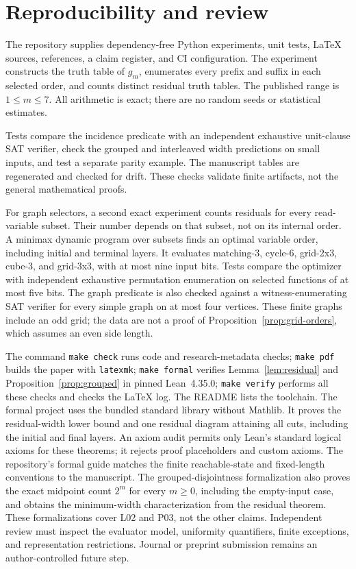 \section{Reproducibility and review}
The repository supplies dependency-free Python experiments, unit
tests, LaTeX sources, references, a claim register, and CI configuration.
The experiment constructs the truth table of \(g_m\), enumerates every
prefix and suffix in each selected order, and counts distinct residual
truth tables. The published range is \(1\leq m\leq7\).
All arithmetic is exact; there are no random seeds or statistical
estimates.

Tests compare the incidence predicate with an independent exhaustive
unit-clause SAT verifier, check the grouped and interleaved width
predictions on small inputs, and test a separate parity example.
The manuscript tables are regenerated and checked for drift.
These checks validate finite artifacts, not the general mathematical
proofs.

For graph selectors, a second exact experiment counts residuals for every
read-variable subset. Their number depends on that subset, not on its internal
order. A minimax dynamic program over subsets finds an optimal variable order,
including initial and terminal layers. It evaluates matching-3, cycle-6,
grid-2x3, cube-3, and grid-3x3, with at most nine input bits.
Tests compare the optimizer with independent exhaustive permutation enumeration
on selected functions of at most five bits. The graph predicate is also checked
against a witness-enumerating SAT verifier for every simple graph on at most
four vertices. These finite graphs include an odd grid; the data are not a
proof of Proposition~\ref{prop:grid-orders}, which assumes an even side length.

The command \texttt{make check} runs code and research-metadata checks;
\texttt{make pdf} builds the paper with \texttt{latexmk};
\texttt{make formal} verifies Lemma~\ref{lem:residual} and
Proposition~\ref{prop:grouped} in pinned Lean~4.35.0;
\texttt{make verify} performs all these checks and checks the LaTeX log.
The README lists the toolchain.
The formal project uses the bundled standard library without Mathlib.
It proves the residual-width lower bound and one residual diagram attaining
all cuts, including the initial and final layers. An axiom audit permits
only Lean's standard logical axioms for these theorems; it rejects proof
placeholders and custom axioms. The repository's formal guide matches the
finite reachable-state and fixed-length conventions to the manuscript.
The grouped-disjointness formalization also proves the exact midpoint count
\(2^m\) for every \(m\geq0\), including the empty-input case, and obtains
the minimum-width characterization from the residual theorem. These
formalizations cover L02 and P03, not the other claims.
Independent review must inspect the evaluator model, uniformity
quantifiers, finite exceptions, and representation restrictions.
Journal or preprint submission remains an author-controlled future step.

